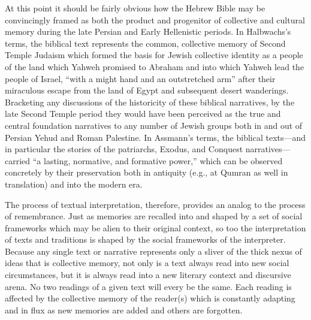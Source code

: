 At this point it should be fairly obvious how the Hebrew Bible may be
convincingly framed as both the product and progenitor of collective and
cultural memory during the late Persian and Early Hellenistic periods.
In Halbwachs's terms, the biblical text represents the common,
collective memory of Second Temple Judaism which formed the basis for
Jewish collective identity as a people of the land which Yahweh promised
to Abraham and into which Yahweh lead the people of Israel, ``with a
might hand and an outstretched arm'' after their miraculous escape from
the land of Egypt and subsequent desert wanderings. Bracketing any
discussions of the historicity of these biblical narratives, by the late
Second Temple period they would have been perceived as the true and
central foundation narratives to any number of Jewish groups both in and
out of Persian Yehud and Roman Palestine. In Assmann's terms, the
biblical texts---and in particular the stories of the patriarchs,
Exodus, and Conquest narratives---carried ``a lasting, normative, and
formative power,''\autocite[38]{assmann2011} which can be observed
concretely by their preservation both in antiquity (e.g., at Qumran as
well in translation) and into the modern era.

The process of textual interpretation, therefore, provides an analog to
the process of remembrance. Just as memories are recalled into and
shaped by a set of social frameworks which may be alien to their
original context, so too the interpretation of texts and traditions is
shaped by the social frameworks of the interpreter. Because any single
text or narrative represents only a sliver of the thick nexus of ideas
that is collective memory, not only is a text always read into new
social circumstances, but it is always read into a new literary context
and discursive arena. No two readings of a given text will every be the
same. Each reading is affected by the collective memory of the reader(s)
which is constantly adapting and in flux as new memories are added and
others are forgotten.

